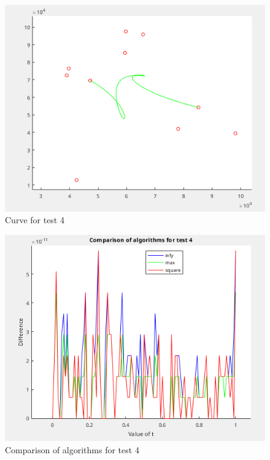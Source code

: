 \documentclass[]{article}
\begin{document}
\begin{figure}
	\centering
	\includegraphics[width=0.8\linewidth]{figs/04-curve.png}
	\caption{Curve for test 4}
	\label{fig:04-curve}
\end{figure}

\begin{figure}
	\centering
	\includegraphics[width=0.8\linewidth]{figs/04-diffs.png}
	\caption{Comparison of algorithms for test 4}
	\label{fig:04-diffs}
\end{figure}
\end{document}
